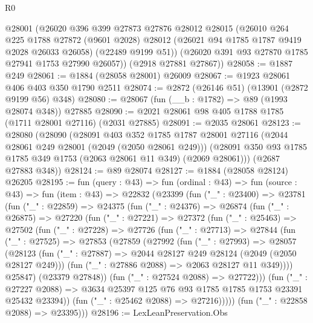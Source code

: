 \begin{lexlean}{R0}
\begin{coremodule}
      @28001
      (@26020
        @396
        @399
        @27873
        @27876
        @28012
        @28015
        (@26010
          @264
          @225
          @1788
          @27872
          (@9601 @2028)
          @28012
          (@26021 @94 @1785 @1787 @9419 @2028 @26033 @26058)
          (@22489 @9199 @51))
        (@26020 @391 @93 @27870 @1785 @27941 @1753 @27990 @26057))
      (@2918 @27881 @27867))
@28058 := @1887 @249
@28061 := @1884 (@28058 @28001) @26009
@28067 := @1923 @28061 @406 @403 @350 @1790 @2511
@28074 := @2872 (@26146 @51) (@13901 (@2872 @9199 @56) @348)
@28080 := @28067 (fun (__b : @1782) => @89 (@1993 @28074 @348)) @27885
@28090 := @2021 @28061 @98 @405 @1788 @1785 (@1711 @28001 @27116) (@2031 @27885)
@28091 := @2035 @28061
@28123 := @28080
    (@28090
      (@28091
        @403
        @352
        @1785
        @1787
        @28001
        @27116
        (@2044 @28061 @249 @28001 (@2049 (@2050 @28061 @249)))
        (@28091 @350 @93 @1785 @1785 @349 @1753 (@2063 @28061 @11 @349) (@2069 @28061)))
      (@2687 @27883 @348))
@28124 := @89 @28074
@28127 := @1884 (@28058 @28124) @26205
@28195 := fun (query : @43) =>
  fun (ordinal : @43) =>
  fun (source : @43) =>
  fun (item : @43) =>
  @22832
    (@23399
      (fun ("_" : @23400) =>
      @23781
        (fun ("_" : @22859) =>
        @24375
          (fun ("_" : @24376) =>
          @26874
            (fun ("_" : @26875) =>
            @27220
              (fun ("_" : @27221) =>
              @27372
                (fun ("_" : @25463) =>
                @27502
                  (fun ("_" : @27228) =>
                  @27726
                    (fun ("_" : @27713) =>
                    @27844
                      (fun ("_" : @27525) =>
                      @27853
                        (@27859
                          (@27992
                            (fun ("_" : @27993) =>
                            @28057
                              (@28123
                                (fun ("_" : @27887) =>
                                @2044 @28127 @249 @28124 (@2049 (@2050 @28127 @249)))
                                (fun ("_" : @27886 @2088) => @2063 @28127 @11 @349))))
                          @25847)
                        (@23379 @27848))
                      (fun ("_" : @27524 @2088) => @27722)))
                  (fun ("_" : @27227 @2088) =>
                  @3634 @25397 @125 @76 @93 @1785 @1785 @1753 @23391 @25432 @23394))
                (fun ("_" : @25462 @2088) => @27216)))))
        (fun ("_" : @22858 @2088) => @23395)))
@28196 := LexLeanPreservation.Obs

\end{coremodule}
\end{lexlean}

